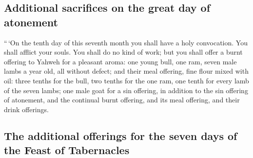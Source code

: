 \hypertarget{additional-sacrifices-on-the-great-day-of-atonement}{%
\subsection{Additional sacrifices on the great day of
atonement}\label{additional-sacrifices-on-the-great-day-of-atonement}}

 ``\,`On the tenth day of this seventh month you shall
have a holy convocation. You shall afflict your souls. You shall do no
kind of work;  but you shall offer a burnt offering to
Yahweh for a pleasant aroma: one young bull, one ram, seven male lambs a
year old, all without defect;  and their meal offering,
fine flour mixed with oil: three tenths for the bull, two tenths for the
one ram,  one tenth for every lamb of the seven lambs;
 one male goat for a sin offering, in addition to the sin
offering of atonement, and the continual burnt offering, and its meal
offering, and their drink offerings.

\hypertarget{the-additional-offerings-for-the-seven-days-of-the-feast-of-tabernacles}{%
\subsection{The additional offerings for the seven days of the Feast of
Tabernacles}\label{the-additional-offerings-for-the-seven-days-of-the-feast-of-tabernacles}}

